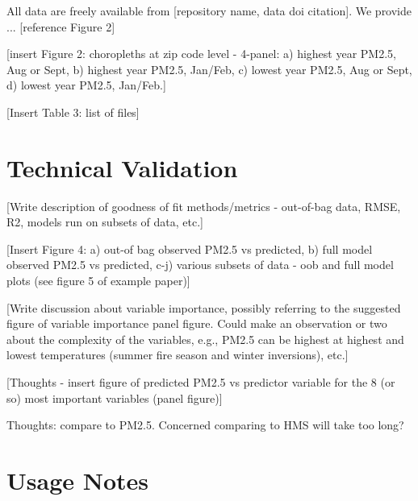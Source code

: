\documentclass[english]{article}
\begin{document}
All data are freely available from [repository name, data doi citation]. We provide ... [reference Figure 2]

[insert Figure 2: choropleths at zip code level - 4-panel: a) highest year PM2.5, Aug or Sept, b) highest year PM2.5, Jan/Feb, c) lowest year PM2.5, Aug or Sept, d) lowest year PM2.5, Jan/Feb.]

[Insert Table 3: list of files]

\section*{Technical Validation}


[Write description of goodness of fit methods/metrics - out-of-bag data, RMSE, R2, models run on subsets of data, etc.]

[Insert Figure 4: a) out-of bag observed PM2.5 vs predicted, b) full model observed PM2.5 vs predicted, c-j) various subsets of data - oob and full model plots (see figure 5 of example paper)]

[Write discussion about variable importance, possibly referring to the suggested figure of variable importance panel figure. Could make an observation or two about the complexity of the variables, e.g., PM2.5 can be highest at highest and lowest temperatures (summer fire season and winter inversions), etc.]

[Thoughts - insert figure of predicted PM2.5 vs predictor variable for the 8 (or so) most important variables (panel figure)]

Thoughts: compare to PM2.5. Concerned comparing to HMS will take too long? 


\section*{Usage Notes}

\end{document}
